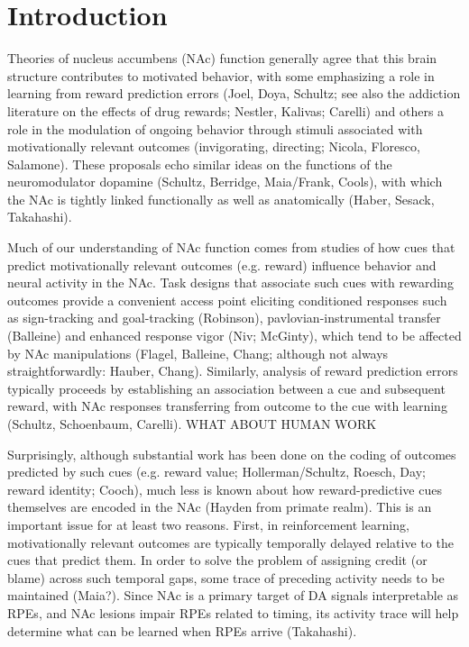 \documentclass[11pt]{article}
\let\cite=\citep
\begin{document}
\section*{Introduction}

Theories of nucleus accumbens (NAc) function generally agree that this brain structure contributes to motivated behavior, with some emphasizing a role in learning from reward prediction errors (Joel, Doya, Schultz; see also the addiction literature on the effects of drug rewards; Nestler, Kalivas; Carelli) and others a role in the modulation of ongoing behavior through stimuli associated with motivationally relevant outcomes (invigorating, directing; Nicola, Floresco, Salamone). These proposals echo similar ideas on the functions of the neuromodulator dopamine (Schultz, Berridge, Maia/Frank, Cools), with which the NAc is tightly linked functionally as well as anatomically (Haber, Sesack, Takahashi).

Much of our understanding of NAc function comes from studies of how cues that predict motivationally relevant outcomes (e.g. reward) influence behavior and neural activity in the NAc. Task designs that associate such cues with rewarding outcomes provide a convenient access point eliciting conditioned responses such as sign-tracking and goal-tracking (Robinson), pavlovian-instrumental transfer (Balleine) and enhanced response vigor (Niv; McGinty), which tend to be affected by NAc manipulations (Flagel, Balleine, Chang; although not always straightforwardly: Hauber, Chang). Similarly, analysis of reward prediction errors typically proceeds by establishing an association between a cue and subsequent reward, with NAc responses transferring from outcome to the cue with learning (Schultz, Schoenbaum, Carelli). WHAT ABOUT HUMAN WORK

Surprisingly, although substantial work has been done on the coding of outcomes predicted by such cues (e.g. reward value; Hollerman/Schultz, Roesch, Day; reward identity; Cooch), much less is known about how reward-predictive cues themselves are encoded in the NAc (Hayden from primate realm). This is an important issue for at least two reasons. First, in reinforcement learning, motivationally relevant outcomes are typically temporally delayed relative to the cues that predict them. In order to solve the problem of assigning credit (or blame) across such temporal gaps, some trace of preceding activity needs to be maintained \cite{Lee2012} (Maia?). Since NAc is a primary target of DA signals interpretable as RPEs, and NAc lesions impair RPEs related to timing, its activity trace will help determine what can be learned when RPEs arrive (Takahashi).
\end{document}
